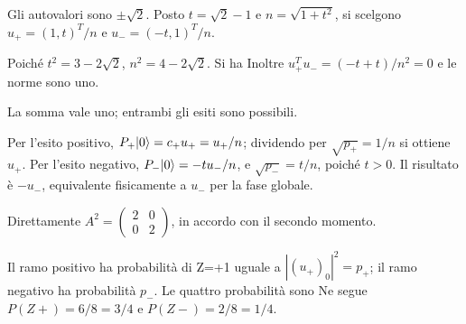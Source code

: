 \ExSolution


Gli autovalori sono \(\pm\sqrt2\). Posto \(t=\sqrt2-1\) e \(n=\sqrt{1+t^2}\), si scelgono \(u_+=(1,t)^T/n\) e \(u_-=(-t,1)^T/n\).


Poiché \(t^2=3-2\sqrt2\), \(n^2=4-2\sqrt2\). Si ha
Inoltre \(u_+^Tu_-=(-t+t)/n^2=0\) e le norme sono uno.


La somma vale uno; entrambi gli esiti sono possibili.


Per l’esito positivo, \(P_+\lvert 0\rangle=c_+u_+=u_+/n\); dividendo per \(\sqrt{p_+}=1/n\) si ottiene \(u_+\). Per l’esito negativo, \(P_-\lvert 0\rangle=-tu_-/n\), e \(\sqrt{p_-}=t/n\), poiché \(t>0\). Il risultato è \(-u_-\), equivalente fisicamente a \(u_-\) per la fase globale.


Direttamente \(A^2=\begin{pmatrix}2&0\\0&2\end{pmatrix}\), in accordo con il secondo momento.


Il ramo positivo ha probabilità di Z=+1 uguale a \(|(u_+)_0|^2=p_+\); il ramo negativo ha probabilità \(p_-\). Le quattro probabilità sono
Ne segue \(P(Z+)=6/8=3/4\) e \(P(Z-)=2/8=1/4\).

